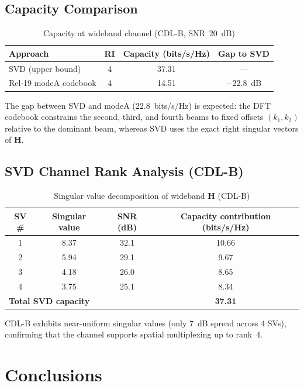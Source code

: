 \documentclass[11pt,a4paper]{article}
\begin{document}
\subsection{Capacity Comparison}

\begin{table}[h]
\centering
\caption{Capacity at wideband channel (CDL-B, SNR~20~dB)}
\begin{tabular}{lccc}
\toprule
Approach & RI & Capacity (bits/s/Hz) & Gap to SVD \\
\midrule
SVD (upper bound) & 4 & 37.31 & --- \\
Rel-19 modeA codebook & 4 & 14.51 & $-22.8$~dB \\
\bottomrule
\end{tabular}
\end{table}

The gap between SVD and modeA (22.8~bits/s/Hz) is expected: the DFT codebook
constrains the second, third, and fourth beams to fixed offsets $(k_1,k_2)$
relative to the dominant beam, whereas SVD uses the exact right singular
vectors of $\mathbf{H}$.

\subsection{SVD Channel Rank Analysis (CDL-B)}

\begin{table}[h]
\centering
\caption{Singular value decomposition of wideband $\mathbf{H}$ (CDL-B)}
\begin{tabular}{cccc}
\toprule
SV \# & Singular value & SNR (dB) & Capacity contribution (bits/s/Hz) \\
\midrule
1 & 8.37 & 32.1 & 10.66 \\
2 & 5.94 & 29.1 & 9.67 \\
3 & 4.18 & 26.0 & 8.65 \\
4 & 3.75 & 25.1 & 8.34 \\
\midrule
\multicolumn{3}{l}{\textbf{Total SVD capacity}} & \textbf{37.31} \\
\bottomrule
\end{tabular}
\end{table}

CDL-B exhibits near-uniform singular values (only 7~dB spread across 4 SVs),
confirming that the channel supports spatial multiplexing up to rank~4.

\section{Conclusions}
\end{document}
